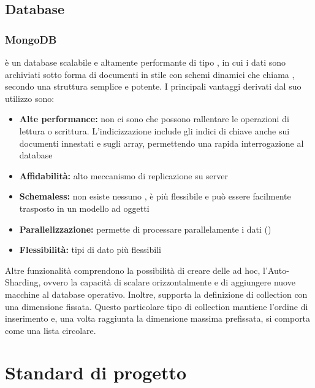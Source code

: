 \documentclass[12pt,a4paper]{article}
\begin{document}
\subsection{Database}
\subsubsection{MongoDB}\label{mongodb}
 è un database   scalabile e altamente performante di tipo , in cui i dati sono archiviati sotto forma di documenti in stile  con schemi dinamici che  chiama , secondo una struttura semplice e potente. I principali vantaggi derivati dal suo utilizzo sono:

\begin{itemize}
	\item \textbf{Alte performance:} non ci sono  che possono rallentare le operazioni di lettura o scrittura. L’indicizzazione include gli indici di chiave anche sui documenti innestati e sugli array, permettendo una rapida interrogazione al database
	\item \textbf{Affidabilità:} alto meccanismo di replicazione su server
	\item \textbf{Schemaless:} non esiste nessuno , è più flessibile e può essere facilmente trasposto in un modello ad oggetti
	\item \textbf{Parallelizzazione:} permette di processare parallelamente i dati ()
	\item \textbf{Flessibilità:} tipi di dato più flessibili
\end{itemize}

Altre funzionalità comprendono la possibilità di creare delle  ad hoc, l’Auto-Sharding, ovvero la capacità di scalare orizzontalmente e di aggiungere nuove macchine al database operativo. Inoltre,  supporta la definizione di collection con una dimensione fissata. Questo particolare tipo di collection mantiene l’ordine di inserimento e, una volta raggiunta la dimensione massima prefissata, si comporta come una lista circolare.

\newpage
\section{Standard di progetto}

\end{document}
